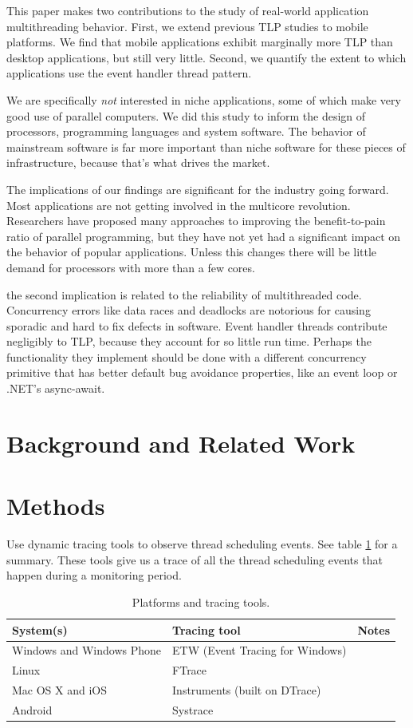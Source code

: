 \documentclass[11pt]{sigplanconf}
\begin{document}
This paper makes two contributions to the study of real-world
application multithreading behavior.  First, we extend previous TLP
studies to mobile platforms.  We find that mobile applications exhibit
marginally more TLP than desktop applications, but still very little.
Second, we quantify the extent to which applications use the event
handler thread pattern.

We are specifically \emph{not} interested in niche applications, some of
which make very good use of parallel computers.  We did this study to
inform the design of processors, programming languages and system
software.  The behavior of mainstream software is far more important
than niche software for these pieces of infrastructure, because that's
what drives the market.

The implications of our findings are significant for the industry going
forward.  Most applications are not getting involved in the multicore
revolution.  Researchers have proposed many approaches to improving the
benefit-to-pain ratio of parallel programming, but they have not yet had
a significant impact on the behavior of popular applications.  Unless
this changes there will be little demand for processors with more than a
few cores.

the second implication is related to the reliability of multithreaded
code.  Concurrency errors like data races and deadlocks are notorious
for causing sporadic and hard to fix defects in software.  Event handler
threads contribute negligibly to TLP, because they account for so little
run time.  Perhaps the functionality they implement should be done with
a different concurrency primitive that has better default bug avoidance
properties, like an event loop or .NET's async-await.

\section{Background and Related Work}

\section{Methods}

Use dynamic tracing tools to observe thread scheduling events.  See
table \ref{table:tracing-tools} for a summary.  These tools give us a
trace of all the thread scheduling events that happen during a
monitoring period.

\begin{table}

\begin{tabular}{l|l|l}
System(s) & Tracing tool & Notes \\
\hline
Windows and Windows Phone & ETW (Event Tracing for Windows) & \\
Linux                     & FTrace                          & \\
Mac OS X and iOS          & Instruments (built on DTrace)   & \\
Android                   & Systrace                        & 
\end{tabular}
\caption{Platforms and tracing tools.}
\label{table:tracing-tools}
\end{table}
\end{document}

